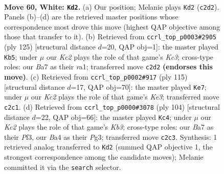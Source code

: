 \documentclass[11pt]{article}
\begin{document}
\clearpage

\begin{figure}[p]\centering
\begin{subfigure}{0.46\textwidth}\centering
\resizebox{\linewidth}{!}{%
\newchessgame
\chessboard[
  setfen={2k5/B1p5/6R1/5p2/Bn3P2/8/2K4P/8 w - - 1 60},
  showmover=false,
  pgfstyle=straightmove, color=movearrow, markmove={c2-d2}
]}
\caption{}
\end{subfigure}\hfill
\begin{subfigure}{0.46\textwidth}\centering
\resizebox{\linewidth}{!}{%
\newchessgame
\chessboard[
  setfen={7r/7P/2k3K1/8/2p1Nb2/p1P5/8/R7 b - - 1 63},
  showmover=false,
  pgfstyle=straightmove, color=movearrow, markmove={c6-b5}
]}
\caption{}
\end{subfigure}
\\[4pt]
\begin{subfigure}{0.46\textwidth}\centering
\resizebox{\linewidth}{!}{%
\newchessgame
\chessboard[
  setfen={2b5/8/2P1k3/P1N3p1/7p/8/8/6K1 b - - 4 58},
  showmover=false,
  pgfstyle=straightmove, color=movearrow, markmove={e6-e7}
]}
\caption{}
\end{subfigure}\hfill
\begin{subfigure}{0.46\textwidth}\centering
\resizebox{\linewidth}{!}{%
\newchessgame
\chessboard[
  setfen={8/3n1p2/3B3k/3N2p1/3n4/1K3PPP/8/8 w - - 1 53},
  showmover=false,
  pgfstyle=straightmove, color=movearrow, markmove={b3-c4}
]}
\caption{}
\end{subfigure}
\caption{\textbf{Move 60, White: \texttt{Kd2}.} (a) Our position; Melanie plays \texttt{Kd2} (\texttt{c2d2}). Panels (b)--(d) are the retrieved master positions whose correspondence most drove this move (highest QAP objective among those that transfer to it). (b) Retrieved from \texttt{ccrl\_top\_p0003\#2905} (ply 125) [structural distance $d$=20, QAP obj=1]: the master played \texttt{Kb5}; under $\mu$ our \emph{Kc2} plays the role of that game's \emph{Kc3}; cross-type roles: our \emph{B}a7 as their \emph{r}a1; transferred move \texttt{c2d2} \textbf{(endorses this move)}. (c) Retrieved from \texttt{ccrl\_top\_p0002\#917} (ply 115) [structural distance $d$=17, QAP obj=70]: the master played \texttt{Ke7}; under $\mu$ our \emph{Kc2} plays the role of that game's \emph{Ke3}; transferred move \texttt{c2c1}. (d) Retrieved from \texttt{ccrl\_top\_p0000\#3078} (ply 104) [structural distance $d$=22, QAP obj=66]: the master played \texttt{Kc4}; under $\mu$ our \emph{Kc2} plays the role of that game's \emph{Kb3}; cross-type roles: our \emph{B}a7 as their \emph{P}f3, our \emph{B}a4 as their \emph{P}g3; transferred move \texttt{c2c3}. Synthesis: 1 retrieved analog transferred to \texttt{Kd2} (summed QAP objective 1, the strongest correspondence among the candidate moves); Melanie committed it via the \texttt{search} selector.}
\label{fig:thought-m118}
\end{figure}
\end{document}
